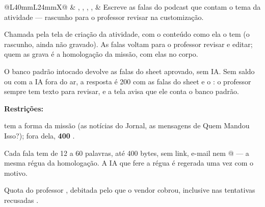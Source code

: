 \begin{tabularx}{\linewidth}{@{}L{40mm}L{24mm}X@{}}
\zebra {} & , , , ,  & Escreve as falas do podcast que contam o tema da atividade --- rascunho para o professor revisar na customização.\par Chamada pela tela de criação da atividade, com o conteúdo como ela o tem (o rascunho, ainda não gravado). As falas voltam para o professor revisar e editar; quem as grava é a homologação da missão, com elas no corpo.\par O banco padrão intocado devolve as falas do sheet aprovado, sem IA. Sem saldo ou com a IA fora do ar, a resposta é 200 com as falas do sheet e o : o professor sempre tem texto para revisar, e a tela avisa que ele conta o banco padrão.\par \textbf{Restrições:}\par \hspace*{1em}\textbullet{}  tem a forma da missão (as notícias do Jornal, as mensagens de Quem Mandou Isso?); fora dela, \textbf{400} .\par \hspace*{1em}\textbullet{} Cada fala tem de 12 a 60 palavras, até 400 bytes, sem link, e-mail nem @ --- a mesma régua da homologação. A IA que fere a régua é regerada uma vez com o motivo.\par \hspace*{1em}\textbullet{} Quota do professor , debitada pelo que o vendor cobrou, inclusive nas tentativas recusadas .\\

\end{tabularx}
